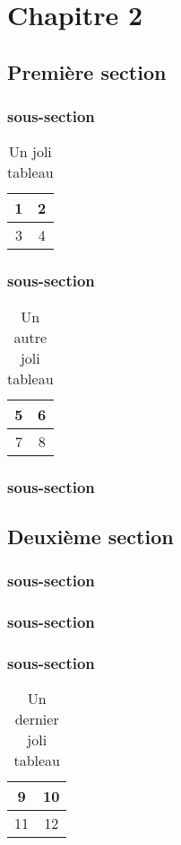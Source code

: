 \chapter{Chapitre 2}
\section{Première section}
\subsection{sous-section}
\lipsum[1-2]
\begin{table}
\begin{center}
\begin{tabular}{|c|c|}
\hline
1 & 2 \\
\hline
3 & 4 \\
\hline
\end{tabular}
\end{center}
\caption{Un joli tableau}
\end{table}
\lipsum[1]
\subsection{sous-section}
\lipsum[1]
\begin{table}
\begin{center}
\begin{tabular}{|c|c|}
\hline
5 & 6 \\
\hline
7 & 8 \\
\hline
\end{tabular}
\end{center}
\caption{Un autre joli tableau}
\end{table}
\lipsum[1]
\subsection{sous-section}
\lipsum[2]

\section{Deuxième section}
\subsection{sous-section}
\lipsum[2]
\subsection{sous-section}
\lipsum[2]
\subsection{sous-section}
\lipsum[2]
\begin{table}
\begin{center}
\begin{tabular}{|c|c|}
\hline
9 & 10 \\
\hline
11 & 12 \\
\hline
\end{tabular}
\end{center}
\caption{Un dernier joli tableau}
\end{table}
\lipsum[1]
